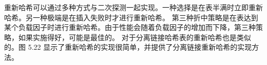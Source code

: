 \documentclass[a4paper]{ctexart}
\theoremstyle{definition}
\theoremstyle{definition}
\begin{document}
重新哈希可以通过多种方式与二次探测一起实现。一种选择是在表半满时立即重新哈希。另一种极端是在插入失败时才进行重新哈希。
第三种折中策略是在表达到某个负载因子时进行重新哈希。由于性能会随着负载因子的增加而下降，第三种策略，如果实施得好，可能是最佳的。
对于分离链接哈希表的重新哈希也是类似的。图 5.22 显示了重新哈希的实现很简单，并提供了分离链接重新哈希的实现方法。








\end{document}
